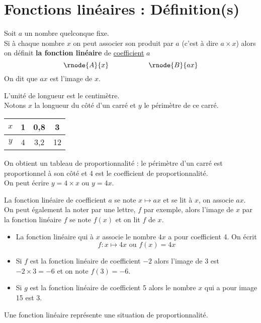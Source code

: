 \section{Fonctions linéaires : Définition(s)}
\begin{definition}
    Soit $a$ un nombre quelconque \og{}fixe\fg{}.
    \\
    Si à chaque nombre $x$ on peut associer son produit par $a$ (c'est à dire $a\times x$) alors on définit {\bf la fonction linéaire} de \underline{coefficient} $a$
    $$\rnode{A}{x}\kern2cm\rnode{B}{ax}$$
    On dit que $ax$ est l'image de $x$.
\end{definition}
\begin{exemple*1}
    L'unité de longueur est le centimètre.\\
    Notons $x$ la longueur du côté d'un carré et $y$ le périmètre de ce carré.

    \medskip
    \begin{minipage}{0.45\linewidth}
        \begin{tabular}{|c|c|c|c|}
        \hline
        $x$&1&0,8&3\\
        \hline
        $y$&4&3,2&12\\
        \hline
        \end{tabular}
    \end{minipage}
    \begin{minipage}{0.45\linewidth}
        On obtient un tableau de proportionnalité : le périmètre d'un carré est proportionnel à son côté et 4 est le coefficient de proportionnalité.
        \\On peut écrire $y=4\times x$ ou $y=4x$.
    \end{minipage}
\end{exemple*1}
\begin{definition}
    La fonction linéaire de coefficient $a$ se note $x\mapsto ax$ et se lit \og{}à $x$, on associe $ax$\fg{}.\\
    On peut également la noter par une lettre, $f$ par exemple, alors l'image de $x$ par la fonction linéaire $f$ se note $f(x)$ et on lit \og{}$f$ de $x$\fg{}.
\end{definition}
\begin{exemple*1}
    \begin{itemize}
        \item La fonction linéaire qui à $x$ associe le nombre $4x$ a pour coefficient 4. On écrit
        $$f:x\mapsto4x\mbox{ ou }f(x)=4x$$
        \item Si $f$ est la fonction linéaire de coefficient $-2$ alors l'image de $3$ est $-2\times3=-6$ et on note $f(3)=-6$.
        \item Si $g$ est la fonction linéaire de coefficient 5 alors le nombre $x$ qui a pour image 15 est 3.
    \end{itemize}
\end{exemple*1}

\begin{remarque}
    Une fonction linéaire représente une situation de proportionnalité.
\end{remarque}

